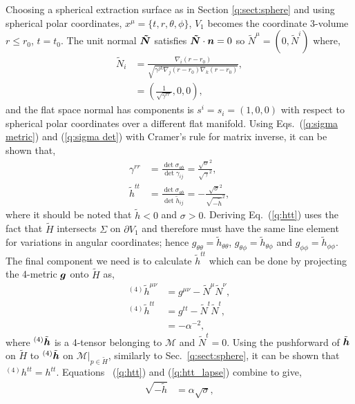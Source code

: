 Choosing a spherical extraction surface as in Section \ref{q:sect:sphere} and using spherical polar coordinates, $x^\mu = \{t,r,\theta,\phi\}$, $V_1$ becomes the coordinate 3-volume $r\leq r_0$, $t=t_0$. The unit normal $\boldsymbol{\tilde{N}}$ satisfies $\boldsymbol{\tilde{N}}\cdot \boldsymbol{n} =0$ so $\tilde N^\mu = (0,\tilde N^i)$ where,
\begin{align}
\tilde N_i &= \frac{\nabla_i (r-r_0)}{\sqrt{\gamma^{jk}\nabla_j (r-r_0) \nabla_k (r-r_0)}}, \\
 &= (\frac{1}{\sqrt{\gamma^{rr}}},0,0),
\end{align}
and the flat space normal has components is $s^i = s_i = (1,0,0)$ with respect to spherical polar coordinates over a different flat manifold. Using Eqs.~(\ref{q:sigma metric}) and (\ref{q:sigma det}) with Cramer's rule for matrix inverse, it can be shown that,
\begin{align}
\gamma^{rr} &= \frac{\det \sigma_{ab}}{ \det \gamma_{ij}} = \frac{\sqrt{\sigma}^2}{\sqrt{\gamma}^2}, \\
\label{q:htt}\tilde{h}^{tt} &= \frac{\det \sigma_{ab}}{\det \tilde h_{ij}} = -\frac{\sqrt{\sigma}^2}{\sqrt{-\tilde h}^2},
\end{align}
where it should be noted that $\tilde h < 0$ and $\sigma > 0$. Deriving Eq.~(\ref{q:htt}) uses the fact that $\tilde H$ intersects $\Sigma$ on $\partial V_1$ and therefore must have the same line element for variations in angular coordinates; hence $g_{\theta\theta}=\tilde{h}_{\theta\theta}$, $g_{\theta\phi}=\tilde{h}_{\theta\phi}$ and $g_{\phi\phi}=\tilde{h}_{\phi\phi}$. The final component we need is to calculate $\tilde h^{tt}$ which can be done by projecting the 4-metric $\boldsymbol g$ onto $\tilde H$ as,
\begin{align}
{}^{(4)}\tilde{h}^{\mu\nu} &= g^{\mu\nu} - \tilde{N}^\mu \tilde{N}^\nu,\\
{}^{(4)}\tilde{h}^{tt} &= g^{tt} - \tilde{N}^t\tilde{N}^t,\\
         \label{q:htt_lapse}      &= -\alpha^{-2},
\end{align}
where ${}^{(4)}\tilde{\boldsymbol{h}}$ is a 4-tensor belonging to $\mathcal{M}$ and $\tilde{N}^t=0$. Using the pushforward of $\tilde{\boldsymbol h}$ on $\tilde H$ to ${}^{(4)}\tilde{\boldsymbol h}$ on $\mathcal{M}\vert_{p\in{\tilde H}}$, similarly to Sec.~\ref{q:sect:sphere}, it can be shown that ${}^{(4)}h^{tt}=h^{tt}$. Equations ~(\ref{q:htt}) and (\ref{q:htt_lapse}) combine to give,
\begin{align}
  \sqrt{-\tilde{h}} &= \alpha \sqrt{\sigma},
\end{align}
